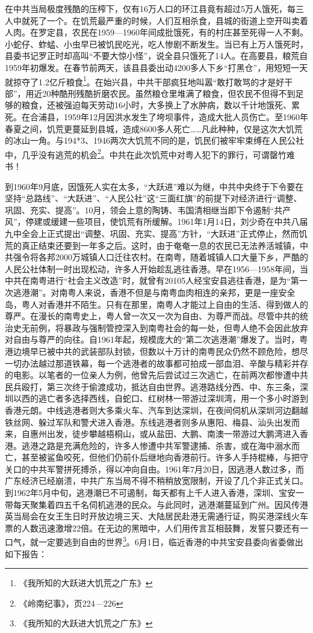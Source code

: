 在中共当局极度残酷的压榨下，仅有16万人口的环江县竟有超过5万人饿死，每三人中就死了一个。在饥荒最严重的时候，人们互相杀食，县城的街道上空开叫卖着人肉。在罗定县，农民在1959—1960年间成批饿死，有的村庄甚至死得一人不剩。小蛇仔、蚱蜢、小虫早已被饥民吃光，吃人惨剧不断发生。当已有上万人饿死时，县委书记罗正时却高叫“不要大惊小怪”，说全县只饿死了14人。在高要县，粮荒自1959年初爆发。在春节前两天，该县县委出动4200多人下乡“打黑仓”，用短短一天就掠夺了1.2亿斤粮食\footnote{《我所知的大跃进大饥荒之广东》}。在始兴县，中共干部疯狂地叫嚣“敢打敢骂的才是好干部”，用近20种酷刑残酷折磨农民。虽然粮仓里堆满了粮食，但农民不但得不到足够的粮食，还被强迫每天劳动16小时，大多换上了水肿病，数以千计地饿死、累死。在合浦县，1959年12月因洪水发生了垮坝事件，造成大批人员伤亡。至1960年春夏之间，饥荒更蔓延到县城，造成8600多人死亡……凡此种种，仅是这次大饥荒的冰山一角。与194*3、1946两次大饥荒不同的是，饥民们被牢牢束缚在人民公社中，几乎没有逃荒的机会\footnote{《岭南纪事》，页224—226}。中共在此次饥荒中对粤人犯下的罪行，可谓罄竹难书！

到1960年9月底，因饿死人实在太多，“大跃进”难以为继，中共中央终于下令要在坚持“总路线”、“大跃进”、“人民公社”这“三面红旗”的前提下对经济进行“调整、巩固、充实、提高”。10月，领会上意的陶铸、韦国清相继当即下令遏制“共产风”，停建或缓建一些项目，使饥荒有所缓解。1961年1月14日，刘少奇在中共八届九中全会上正式提出“调整、巩固、充实、提高”方针，“大跃进”正式停止，然而饥荒的真正结束还要到一年多之后。这时，由于奄奄一息的农民已无法养活城镇，中共强令将各邦2000万城镇人口迁往农村。在南粤，随着城镇人口大量下乡，严酷的人民公社体制一时出现松动，许多人开始趁乱逃往香港。早在1956—1958年间，当中共在南粤进行“社会主义改造”时，就曾有20105人经宝安县逃往香港，是为“第一次逃港潮”。对南粤人来说，香港不但是与南粤血肉相连的亲邦，更是一座安全岛，粤人对香港并不陌生。只有在那里，南粤人才能过上自由的生活、得到做人的尊严。在漫长的南粤史上，粤人曾一次又一次为自由、为尊严而战。尽管中共的统治史无前例，将暴政与强制管控深入到南粤社会的每一处，但粤人绝不会因此放弃对自由与尊严的向往。自1961年起，规模庞大的“第二次逃港潮”爆发了。当时，粤港边境早已被中共的武装部队封锁，但数以十万计的南粤民众仍然不顾危险，想尽一切办法越过那道铁幕，每一个逃港者的故事都可拍成一部血泪、辛酸与精彩并存的电影。以笔者的一位亲人为例，他曾先后尝试过三次逃亡，在前两次都惨遭中共民兵殴打，第三次终于偷渡成功，抵达自由世界。逃港路线分西、中、东三条，深圳以西的逃亡者多选择西线，自蛇口、红树林一带游过深圳湾，用一个多小时游到香港元朗。中线逃港者则大多乘火车、汽车到达深圳，在夜间伺机从深圳河边翻越铁丝网、躲过军队和警犬进入香港。东线逃港者则多从惠阳、梅县、汕头出发而来，自惠州出发，徒步攀越梧桐山，或从盐田、大鹏、南澳一带游过大鹏湾进入香港。逃港之路是充满危险的，许多人惨遭中共军警逮捕、杀害，或在海中溺水而亡，甚至被鲨鱼咬死，但他们仍前仆后继地向香港前行。许多人手持棍棒，与把守关口的中共军警拼死搏杀，得以冲向自由。1961年7月20日，因逃港人数过多，而广东经济已经崩溃，中共广东当局不得不稍稍放宽限制，开设了几个非正式关口。到1962年5月中旬，逃港潮已不可遏制，每天都有上千人进入香港，深圳、宝安一带每天聚集着四五千名伺机逃港的民众。与此同时，逃港潮蔓延到广州。因风传港英当局会在女王生日时开放边境三天、大陆居民赴港无需通行证，购买港深线火车票的人数迅速激增22倍。在无边的黑暗中，人们用传言互相鼓舞，发誓只要还有一口气，就一定要逃到自由的世界\footnote{《我所知的大跃进大饥荒之广东》}。6月1日，临近香港的中共宝安县委向省委做出如下报告：

